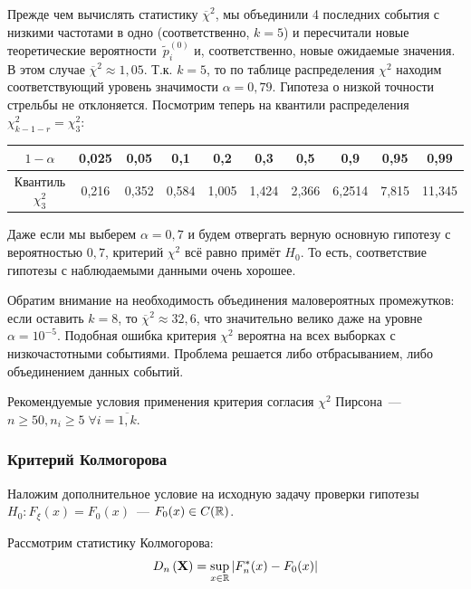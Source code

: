 \begin{exmp}
    Прежде чем вычислять статистику $\overline{\chi}^{2}$, мы объединили 4 последних события с низкими частотами в одно (соответственно, $k=5$) 
    и пересчитали новые теоретические вероятности~$\tilde{p}_i^{(0)}$ и, соответственно, новые ожидаемые значения. 
    В этом случае $\overline{\chi}^{2} \approx 1{,}05$. 
    Т.к. $k=5$, то по таблице распределения $\chi^{2}$ находим соответствующий уровень значимости $\alpha = 0{,}79$. 
    Гипотеза о низкой точности стрельбы не отклоняется.
    Посмотрим теперь на квантили распределения $\chi^{2}_{k-1-r} = \chi^{2}_{3}$:
    \begin{center}
        \begin{tabular}{|c|c|c|c|c|c|c|c|c|c|}
            \hline $1 - \alpha$         & 0{,}025 & 0{,}05  & 0{,}1   & 0{,}2   & 0{,}3   & 0{,}5  & 0{,}9  & 0{,}95  & 0{,}99 \\
            \hline Квантиль $\chi^{2}_{3}$ & 0{,}216 & 0{,}352 & 0{,}584 & 1{,}005 & 1{,}424 & 2{,}366 & 6{,}2514 & 7{,}815 & 11{,}345 \\
            \hline
        \end{tabular}
    \end{center}
    Даже если мы выберем $\alpha = 0{,}7$ и будем отвергать верную основную гипотезу с вероятностью $0{,}7$, критерий $\chi^2$ всё равно примёт $H_0$.
    То есть, соответствие гипотезы с наблюдаемыми данными очень хорошее.
    
    Обратим внимание на необходимость объединения маловероятных промежутков: если оставить $k = 8$, то $\overline{\chi}^{2} \approx 32{,}6$, 
    что значительно велико даже на уровне $\alpha = 10^{-5}$. 
    Подобная ошибка критерия $\chi^{2}$ вероятна на всех выборках с низкочастотными событиями. 
    Проблема решается либо отбрасыванием, либо объединением данных событий. %
\end{exmp}
Рекомендуемые условия применения критерия согласия $\chi^2$ Пирсона~--- $n \geqslant 50, n_i \geqslant 5 \; \forall i = \overline{1, k}$.
    
    
\subsubsection{Критерий Колмогорова}
Наложим дополнительное условие на исходную задачу проверки гипотезы $H_0\colon F_{\xi}(x) = F_0(x)$~--- $F_{0}(x) \in C(\mathbb{R})$.

Рассмотрим статистику Колмогорова:
\begin{equation*}
    D_{n}\left(\mathbf{X}\right)=\sup\limits_{x \in \mathbb{R}}\left|F_{n}^{*}(x)-F_{0}(x)\right|
\end{equation*}

